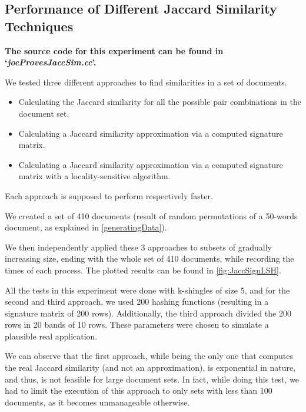 \documentclass[12pt]{article}
\begin{document}

\subsection{Performance of Different Jaccard Similarity Techniques}
\textbf{The source code for this experiment can be found in `\textit{jocProvesJaccSim.cc}'.}
\bigskip

We tested three different approaches to find similarities in a set of documents.
\begin{itemize}
\item Calculating the Jaccard similarity for all the possible pair combinations in the document set.
\item Calculating a Jaccard similarity approximation via a computed signature matrix.
\item Calculating a Jaccard similarity approximation via a computed signature matrix with a locality-sensitive algorithm.
\end{itemize}

Each approach is supposed to perform respectively faster.

\bigskip
We created a set of 410 documents (result of random permutations of a 50-words document, as explained in \autoref{generatingData}). 

We then independently applied these 3 approaches to subsets of gradually increasing size, ending with the whole set of 410 documents, while recording the times of each process.
The plotted results can be found in \autoref{fig:JaccSignLSH}.

All the tests in this experiment were done with k-shingles of size 5, and for the second and third approach, we used 200 hashing functions (resulting in a signature matrix of 200 rows). Additionally, the third approach divided the 200 rows in 20 bands of 10 rows. These parameters were chosen to simulate a plausible real application.

\bigskip

We can observe that the first approach, while being the only one that computes the real Jaccard similarity (and not an approximation), is exponential in nature, and thus, is not feasible for large document sets. In fact, while doing this test, we had to limit the execution of this approach to only sets with less than 100 documents, as it becomes unmanageable otherwise.
\end{document}
